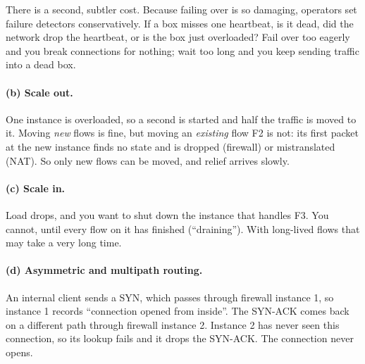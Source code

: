 There is a second, subtler cost. Because failing over is so damaging, operators set failure detectors conservatively. If a box
misses one heartbeat, is it dead, did the network drop the heartbeat, or is the box just overloaded? Fail over too eagerly and you break
connections for nothing; wait too long and you keep sending traffic into a dead box.

\paragraph{(b) Scale out.} One instance is overloaded, so a second is started and half the traffic is moved to it. Moving
\emph{new} flows is fine, but moving an \emph{existing} flow F2 is not: its first packet at the new instance finds no state and
is dropped (firewall) or mistranslated (NAT). So only new flows can be moved, and relief arrives slowly.

\paragraph{(c) Scale in.} Load drops, and you want to shut down the instance that handles F3. You cannot, until every flow on it has
finished (``draining''). With long-lived flows that may take a very long time.

\paragraph{(d) Asymmetric and multipath routing.} An internal client sends a SYN, which passes through firewall instance 1, so
instance 1 records ``connection opened from inside''. The SYN-ACK comes back on a different path through firewall instance 2. Instance
2 has never seen this connection, so its lookup fails and it drops the SYN-ACK. The connection never opens.

